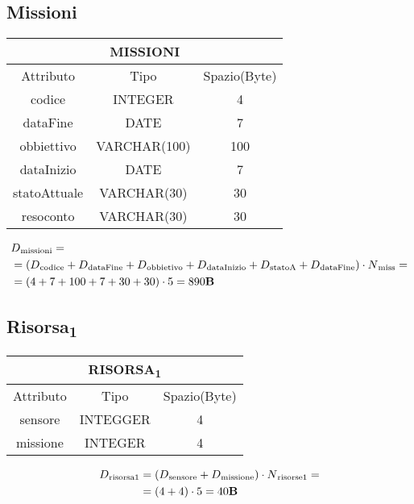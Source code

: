 \subsection{Missioni}
\begin{tabular}{ |c|c|c|}
  \hline
  \multicolumn{3}{|c|}{\textbf{MISSIONI}}\\
  \hline
  Attributo & Tipo & Spazio(Byte) \\
  \hline
  codice & INTEGER & 4 \\
  dataFine & DATE & 7 \\
  obbiettivo & VARCHAR(100) & 100 \\
  dataInizio & DATE & 7 \\
  statoAttuale  & VARCHAR(30) & 30 \\
  resoconto & VARCHAR(30) & 30 \\
  \hline
\end{tabular}
\begin{equation}
  \begin{aligned}
    &D{\text{\textsubscript{missioni}}} =\\
    &=(D{\text{\textsubscript{codice}}}+D{\text{\textsubscript{dataFine}}}+D{\text{\textsubscript{obbietivo}}}+D{\text{\textsubscript{dataInizio}}}+D{\text{\textsubscript{statoA}}}+D{\text{\textsubscript{dataFine}}})\cdot N{\text{\textsubscript{miss}}}=\\
    &=(4+7+100+7+30+30)\cdot 5 = 890\textbf{B}
  \end{aligned}
\end{equation}
\subsection{Risorsa\textsubscript{1}}
\begin{tabular}{|c|c|c|}
  \hline
  \multicolumn{3}{|c|}{\textbf{RISORSA\textsubscript{1}}}\\
  \hline
  Attributo & Tipo & Spazio(Byte) \\
  \hline
  sensore & INTEGGER & 4 \\
  missione & INTEGER & 4 \\
  \hline
\end{tabular}
\begin{equation}
  \begin{aligned}
    D{\text{\textsubscript{risorsa1}}}&=(D{\text{\textsubscript{sensore}}} + D{\text{\textsubscript{missione}}}) \cdot N{\text{\textsubscript{risorse1}}}=\\
    &=(4+4)\cdot 5 = 40\text{\textbf{B}}\\
  \end{aligned}
\end{equation}
